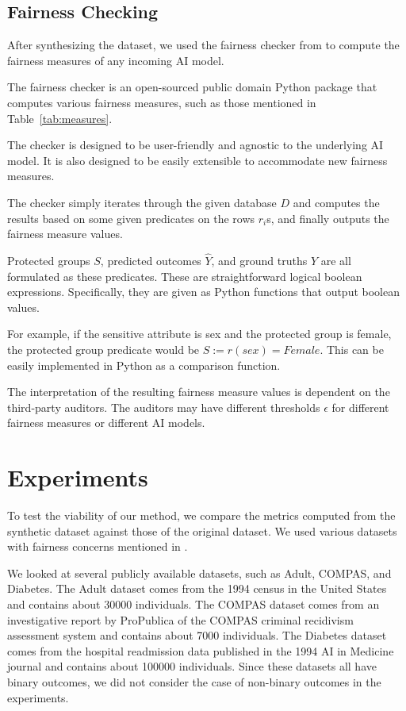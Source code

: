 \documentclass[manuscript,screen,review,anonymous]{acmart}
\newcommand{\db}{D}
\begin{document}
\subsection{Fairness Checking}

After synthesizing the dataset, we used the fairness checker from \cite{yuan2024ensuring} to compute the fairness measures of any incoming AI model.

The fairness checker is an open-sourced public domain Python package that computes various fairness measures, such as those mentioned in Table~\ref{tab:measures}.

The checker is designed to be user-friendly and agnostic to the underlying AI model. It is also designed to be easily extensible to accommodate new fairness measures.

The checker simply iterates through the given database $\db$ and computes the results based on some given predicates on the rows $r_i$s, and finally outputs the fairness measure values.

Protected groups $S$, predicted outcomes $\hat{Y}$, and ground truths $Y$ are all formulated as these predicates. These are straightforward logical boolean expressions. Specifically, they are given as Python functions that output boolean values.

For example, if the sensitive attribute is sex and the protected group is female, the protected group predicate would be $S := r(sex) = Female$. This can be easily implemented in Python as a comparison function.

The interpretation of the resulting fairness measure values is dependent on the third-party auditors. The auditors may have different thresholds $\epsilon$ for different fairness measures or different AI models.

\section{Experiments}

To test the viability of our method, we compare the metrics computed from the synthetic dataset against those of the original dataset. We used various datasets with fairness concerns mentioned in \cite{pessach2022review}.

We looked at several publicly available datasets, such as Adult\cite{adult_2,Kaggle_Adult_Census_Income}, COMPAS\cite{larson2016propublica,Kaggle_COMPAS_Dataset}, and Diabetes\cite{diabetes_34,Kaggle_Diabetes_Prediction}. The Adult dataset comes from the 1994 census in the United States and contains about 30000 individuals. The COMPAS dataset comes from an investigative report by ProPublica of the COMPAS criminal recidivism assessment system and contains about 7000 individuals. The Diabetes dataset comes from the hospital readmission data published in the 1994 AI in Medicine journal and contains about 100000 individuals. Since these datasets all have binary outcomes, we did not consider the case of non-binary outcomes in the experiments.
\end{document}
